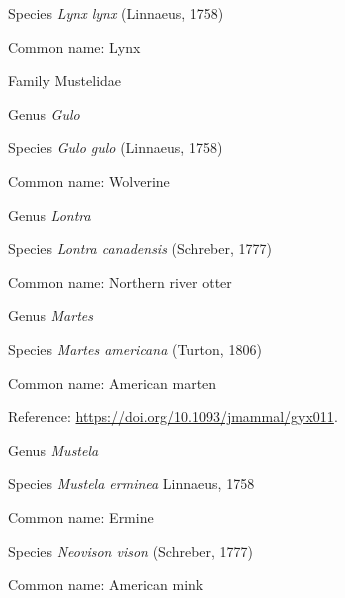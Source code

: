 \documentclass[9pt, article]{memoir}
\begin{document}
\begin{multicols}{2}
\vspace{6pt}\noindent\hspace{36pt}Species \textit{Lynx lynx} (Linnaeus, 1758)


Common name: Lynx

\vspace{6pt}\noindent\hspace{24pt}Family Mustelidae


\vspace{6pt}\noindent\hspace{30pt}Genus \textit{Gulo}


\vspace{6pt}\noindent\hspace{36pt}Species \textit{Gulo gulo} (Linnaeus, 1758)


Common name: Wolverine

\vspace{6pt}\noindent\hspace{30pt}Genus \textit{Lontra}


\vspace{6pt}\noindent\hspace{36pt}Species \textit{Lontra canadensis} (Schreber, 1777)


Common name: Northern river otter

\vspace{6pt}\noindent\hspace{30pt}Genus \textit{Martes}


\vspace{6pt}\noindent\hspace{36pt}Species \textit{Martes americana} (Turton, 1806)


Common name: American marten

Reference: 
\url{https://doi.org/10.1093/jmammal/gyx011}.

\vspace{6pt}\noindent\hspace{30pt}Genus \textit{Mustela}


\vspace{6pt}\noindent\hspace{36pt}Species \textit{Mustela erminea} Linnaeus, 1758


Common name: Ermine

\vspace{6pt}\noindent\hspace{36pt}Species \textit{Neovison vison} (Schreber, 1777)


Common name: American mink


\end{multicols}
\end{document}
